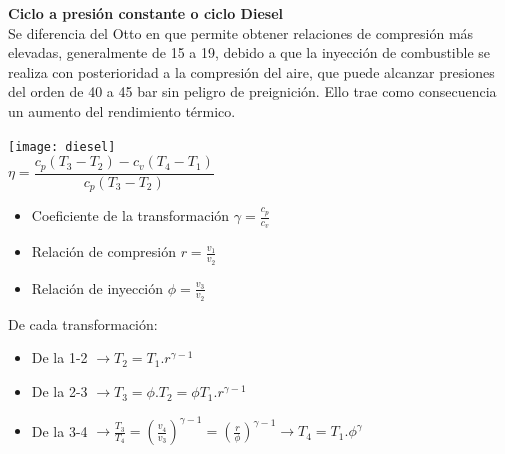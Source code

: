 \documentclass[11pt,a4paper,twocolumn]{article}
\begin{document}
	\textbf{Ciclo a presión constante o ciclo Diesel}\\
	Se diferencia del Otto en que permite obtener relaciones de compresión más elevadas,
	generalmente de 15 a 19, debido a que la inyección de combustible se realiza con
	posterioridad a la compresión del aire, que puede alcanzar presiones del orden de 40
	a 45 bar sin peligro de preignición. Ello trae como consecuencia un aumento del
	rendimiento térmico.
	\begin{center}
		\texttt{[image: diesel]}\\
		$\eta= \dfrac{c_{p}(T_{3}-T_{2})-c_{v}(T_{4}-T_{1})}{c_{p}(T_{3}-T_{2})}$\\
	\end{center}
	\begin{itemize}
		\item Coeficiente de la transformación $\gamma=\frac{c_{p}}{c_{v}}$
		\item Relación de compresión $r=\frac{v_{1}}{v_{2}}$  
		\item Relación de inyección $\phi=\frac{v_{3}}{v_{2}}$
	\end{itemize} 
	
	De cada transformación:
	
	\begin{itemize}
		\item De la 1-2 $\rightarrow T_{2}=T_{1}.r^{\gamma-1}$
		\item De la 2-3 $\rightarrow T_{3}=\phi .T_{2} = \phi T_{1}.r^{\gamma-1}$
		\item De la 3-4 $\rightarrow \frac{T_{3}}{T_{4}}=(\frac{v_{4}}{v_{3}})^{\gamma-1}=(\frac{r}{\phi})^{\gamma-1}\rightarrow T_{4}=T_{1}.\phi^{\gamma}$
	\end{itemize}
	
\end{document}
